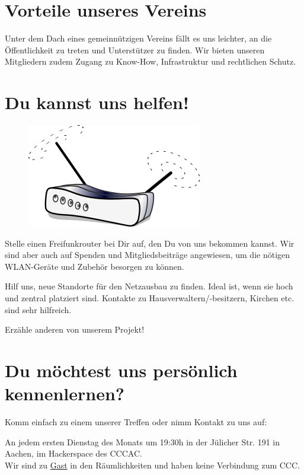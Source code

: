 \documentclass[10pt]{scrartcl}
\begin{document}
\newpage
{}

\section{\normalsize Vorteile unseres Vereins}
Unter dem Dach eines gemeinnützigen Vereins fällt es uns leichter, an die Öffentlichkeit zu treten und Unterstützer zu finden. Wir bieten unseren Mitgliedern zudem Zugang zu Know-How, Infrastruktur und rechtlichen Schutz.

\section{\normalsize Du kannst uns helfen!}
\begin{figure}
\includegraphics[scale=0.4]{Router}
\end{figure}
Stelle einen Freifunkrouter bei Dir auf, den Du von uns bekommen kannst. Wir sind aber auch auf Spenden und Mitgliedsbeiträge angewiesen, um die nötigen WLAN-Geräte und Zubehör besorgen zu können.

Hilf uns, neue Standorte für den Netzausbau zu finden. Ideal ist, wenn sie hoch und zentral platziert sind. Kontakte zu Hausverwaltern/-besitzern, Kirchen etc. sind sehr hilfreich.

Erzähle anderen von unserem Projekt!

\section{\normalsize Du möchtest uns persönlich kennenlernen?}
Komm einfach zu einem unserer Treffen oder nimm Kontakt zu uns auf:
\begin{framed}
\noindent An jedem ersten Dienstag des Monats um 19:30h in der Jülicher Str. 191 in Aachen, im Hackerspace des CCCAC.\\
{\tiny Wir sind zu \underline{Gast} in den Räumlichkeiten und haben keine Verbindung zum CCC.}
\end{framed}
\end{document}
